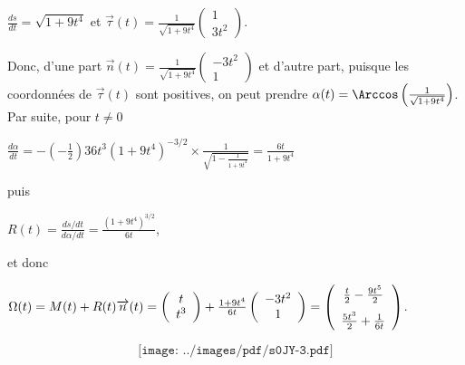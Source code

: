 {\begin{enumerate}
{\begin{center}
$\frac{ds}{dt}=\sqrt{1+9t^4}$ et $\overrightarrow{\tau}(t)=\frac{1}{\sqrt{1+9t^4}}\left(
\begin{array}{c}
1\\
3t^2
\end{array}
\right)$.
\end{center}
Donc, d'une part $\overrightarrow{n}(t)=\frac{1}{\sqrt{1+9t^4}}\left(
\begin{array}{c}
-3t^2\\
1
\end{array}
\right)$ et d'autre part, puisque les coordonnées de $\overrightarrow{\tau}(t)$ sont positives, on peut prendre $\alpha(t)=\Arccos\left(\frac{1}{\sqrt{1+9t^4}}\right)$. Par suite, pour $t\neq0$

\begin{center}
$\frac{d\alpha}{dt}=-\left(-\frac{1}{2}\right)36t^3(1+9t^4)^{-3/2}\times\frac{1}{\sqrt{1-\frac{1}{1+9t^4}}}=\frac{6t}{1+9t^4}$
\end{center}
puis

\begin{center}
$R(t)=\frac{ds/dt}{d\alpha/dt}=\frac{(1+9t^4)^{3/2}}{6t}$,
\end{center}
et donc

\begin{center}
$\Omega(t)=M(t)+R(t)\overrightarrow{n}(t)=\left(
\begin{array}{c}
t\\
t^3
\end{array}
\right)+
\frac{1+9t^4}{6t}\left(
\begin{array}{c}
-3t^2\\
1
\end{array}
\right)
=\left(
\begin{array}{c}
\frac{t}{2}-\frac{9t^5}{2}\\
\rule{0mm}{6mm}\frac{5t^3}{2}+\frac{1}{6t}
\end{array}
\right)$.
\end{center}

$$\texttt{[image: ../images/pdf/s0JY-3.pdf]}$$
}
\end{enumerate}
}
